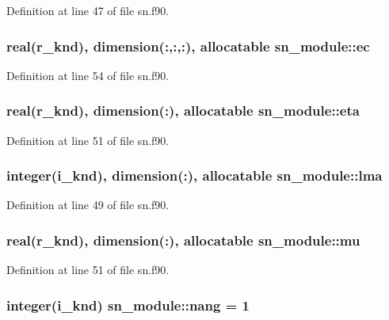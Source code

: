 Definition at line 47 of file sn.\-f90.

\hypertarget{classsn__module_a6c731da2dcf64d3f53314281c79e26a0}{
\subsubsection[{ec}]{\setlength{\rightskip}{0pt plus 5cm}real(r\-\_\-knd), dimension(\-:,\-:,\-:), allocatable sn\-\_\-module\-::ec}}\label{classsn__module_a6c731da2dcf64d3f53314281c79e26a0}


Definition at line 54 of file sn.\-f90.

\hypertarget{classsn__module_a56d70ad9f47dfacf81cec43705659ad5}{
\subsubsection[{eta}]{\setlength{\rightskip}{0pt plus 5cm}real(r\-\_\-knd), dimension(\-:), allocatable sn\-\_\-module\-::eta}}\label{classsn__module_a56d70ad9f47dfacf81cec43705659ad5}


Definition at line 51 of file sn.\-f90.

\hypertarget{classsn__module_a4ea10df8637124ad5ba5fedcad899761}{
\subsubsection[{lma}]{\setlength{\rightskip}{0pt plus 5cm}integer(i\-\_\-knd), dimension(\-:), allocatable sn\-\_\-module\-::lma}}\label{classsn__module_a4ea10df8637124ad5ba5fedcad899761}


Definition at line 49 of file sn.\-f90.

\hypertarget{classsn__module_ac93ecb91c234e5c544ad83bfda53f57b}{
\subsubsection[{mu}]{\setlength{\rightskip}{0pt plus 5cm}real(r\-\_\-knd), dimension(\-:), allocatable sn\-\_\-module\-::mu}}\label{classsn__module_ac93ecb91c234e5c544ad83bfda53f57b}


Definition at line 51 of file sn.\-f90.

\hypertarget{classsn__module_acb1f3dc6837597cfce3b070824a30549}{
\subsubsection[{nang}]{\setlength{\rightskip}{0pt plus 5cm}integer(i\-\_\-knd) sn\-\_\-module\-::nang = 1}}\label{classsn__module_acb1f3dc6837597cfce3b070824a30549}


